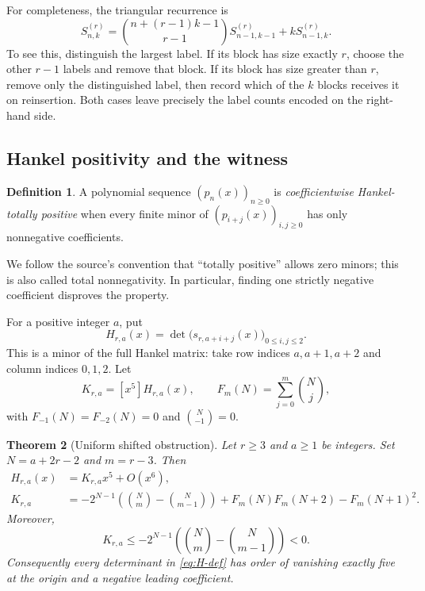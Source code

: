 \documentclass[11pt,a4paper]{article}
\newtheorem{theorem}{Theorem}[section]
\theoremstyle{definition}
\newtheorem{definition}[theorem]{Definition}
\numberwithin{equation}{section}
\begin{document}
For completeness, the triangular recurrence is
\begin{equation}
 S^{(r)}_{n,k}=
 \binom{n+(r-1)k-1}{r-1}S^{(r)}_{n-1,k-1}
       +kS^{(r)}_{n-1,k}.
 \label{eq:triangle-recurrence}
\end{equation}
To see this, distinguish the largest label. If its block has size exactly
$r$, choose the other $r-1$ labels and remove that block. If its block has
size greater than $r$, remove only the distinguished label, then record
which of the $k$ blocks receives it on reinsertion. Both cases leave
precisely the label counts encoded on the right-hand side.

\subsection{Hankel positivity and the witness}

\begin{definition}
A polynomial sequence $(p_n(x))_{n\ge0}$ is \emph{coefficientwise
Hankel-totally positive} when every finite minor of
$(p_{i+j}(x))_{i,j\ge0}$ has only nonnegative coefficients.
\end{definition}

We follow the source's convention that ``totally positive'' allows zero
minors; this is also called total nonnegativity. In particular, finding
one strictly negative coefficient disproves the property.

For a positive integer $a$, put
\begin{equation}
 H_{r,a}(x)=\det\bigl(s_{r,a+i+j}(x)\bigr)_{0\le i,j\le2}.
 \label{eq:H-def}
\end{equation}
This is a minor of the full Hankel matrix: take row indices $a,a+1,a+2$
and column indices $0,1,2$. Let
\begin{equation}
 K_{r,a}=[x^5]H_{r,a}(x),\qquad
 F_m(N)=\sum_{j=0}^{m}\binom Nj,
 \label{eq:K-F}
\end{equation}
with $F_{-1}(N)=F_{-2}(N)=0$ and $\binom N{-1}=0$.

\begin{theorem}[Uniform shifted obstruction]
\label{thm:shifted}
Let $r\ge3$ and $a\ge1$ be integers. Set $N=a+2r-2$ and $m=r-3$. Then
\begin{align}
 H_{r,a}(x)&=K_{r,a}x^5+O(x^6),\label{eq:leading}\\
 K_{r,a}&=-2^{N-1}\left(\binom Nm-\binom N{m-1}\right)
        +F_m(N)F_m(N+2)-F_m(N+1)^2.\label{eq:general-K}
\end{align}
Moreover,
\begin{equation}
 K_{r,a}\le
 -2^{N-1}\left(\binom Nm-\binom N{m-1}\right)<0.
 \label{eq:negative-bound}
\end{equation}
Consequently every determinant in \eqref{eq:H-def} has order of vanishing
exactly five at the origin and a negative leading coefficient.
\end{theorem}
\end{document}
